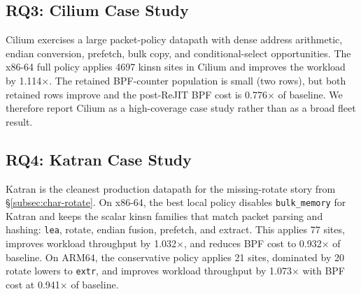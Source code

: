 


\subsection{RQ3: Cilium Case Study}
\label{subsec:eval-cilium}

Cilium exercises a large packet-policy datapath with dense address arithmetic,
endian conversion, prefetch, bulk copy, and conditional-select opportunities.
The x86-64 full policy applies 4697 kinsn sites in Cilium and improves the
workload by 1.114$\times$. The retained BPF-counter population is small
(two rows), but both retained rows improve and the post-ReJIT BPF cost is
0.776$\times$ of baseline. We therefore report Cilium as a high-coverage
case study rather than as a broad fleet result.

\subsection{RQ4: Katran Case Study}
\label{subsec:eval-katran}

Katran is the cleanest production datapath for the missing-rotate story from
\S\ref{subsec:char-rotate}. On x86-64, the best local policy disables
\texttt{bulk\_memory} for Katran and keeps the scalar kinsn families that
match packet parsing and hashing: \texttt{lea}, rotate, endian fusion,
prefetch, and extract. This applies 77 sites, improves workload throughput by
1.032$\times$, and reduces BPF cost to 0.932$\times$ of baseline. On ARM64,
the conservative policy applies 21 sites, dominated by 20 rotate lowers to
\texttt{extr}, and improves workload throughput by 1.073$\times$ with BPF cost
at 0.941$\times$ of baseline.


